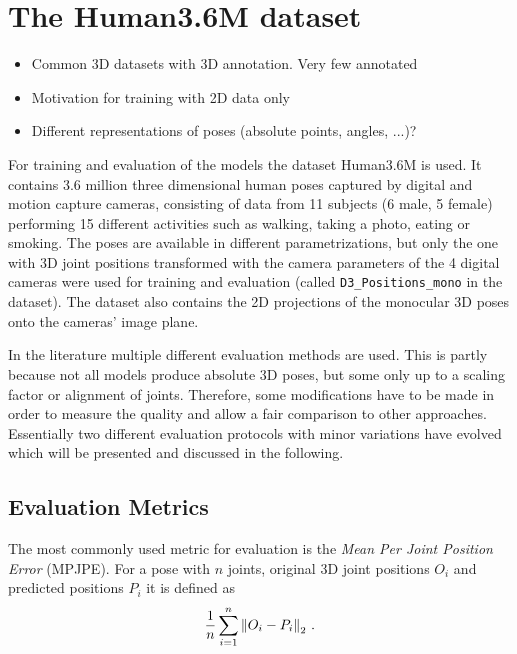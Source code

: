 \section{The Human3.6M dataset}
\label{sec:data}

\begin{itemize}
	\item Common 3D datasets with 3D annotation. Very few annotated
	\item Motivation for training with 2D data only
	\item Different representations of poses (absolute points, angles, ...)?
\end{itemize}
 

For training and evaluation of the models the dataset Human3.6M \cite{ionescu14} is used. 
It contains 3.6 million three dimensional human poses captured by digital and motion capture cameras, consisting of data from 11 subjects (6 male, 5 female) performing 15 different activities such as walking, taking a photo, eating or smoking.
The poses are available in different parametrizations, but only the one with 3D joint positions transformed with the camera parameters of the 4 digital cameras were used for training and evaluation (called \texttt{D3\_Positions\_mono} in the dataset).
The dataset also contains the 2D projections of the monocular 3D poses onto the cameras' image plane.


In the literature multiple different evaluation methods are used. 
This is partly because not all models produce absolute 3D poses, but some only up to a scaling factor or alignment of joints.
Therefore, some modifications have to be made in order to measure the quality and allow a fair comparison to other approaches.
Essentially two different evaluation protocols with minor variations have evolved which will be presented and discussed in the following.

\subsection{Evaluation Metrics}
The most commonly used metric for evaluation is the \textit{Mean Per Joint Position Error} (MPJPE).
For a pose with $n$ joints, original 3D joint positions $O_i$ and predicted positions $P_i$ it is defined as
\begin{equation}
	\frac{1}{n} \sum_{i = 1}^{n}  \norm{O_i - P_i}_2 \ .
\end{equation}

